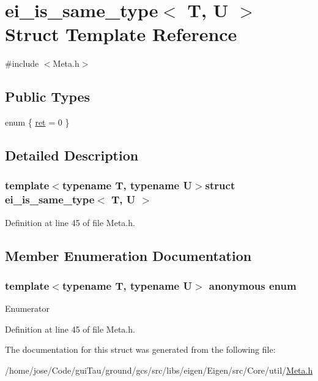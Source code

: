 \hypertarget{structei__is__same__type}{\section{ei\-\_\-is\-\_\-same\-\_\-type$<$ T, U $>$ Struct Template Reference}
\label{structei__is__same__type}
}


{\ttfamily \#include $<$Meta.\-h$>$}

\subsection*{Public Types}
\begin{DoxyCompactItemize}
\item 
enum \{ \hyperlink{structei__is__same__type_a1c77c9dd7ad78d5432afb430c861b08dad71ca8a9f01b3d53f3b65aa1197dd8f2}{ret} = 0
 \}
\end{DoxyCompactItemize}


\subsection{Detailed Description}
\subsubsection*{template$<$typename T, typename U$>$struct ei\-\_\-is\-\_\-same\-\_\-type$<$ T, U $>$}



Definition at line 45 of file Meta.\-h.



\subsection{Member Enumeration Documentation}
\hypertarget{structei__is__same__type_a1c77c9dd7ad78d5432afb430c861b08d}{\subsubsection[{anonymous enum}]{\setlength{\rightskip}{0pt plus 5cm}template$<$typename T, typename U$>$ anonymous enum}}\label{structei__is__same__type_a1c77c9dd7ad78d5432afb430c861b08d}
\begin{Desc}
\item[Enumerator]\par
\begin{description}
\item[{\em 
\hypertarget{structei__is__same__type_a1c77c9dd7ad78d5432afb430c861b08dad71ca8a9f01b3d53f3b65aa1197dd8f2}{ret}\label{structei__is__same__type_a1c77c9dd7ad78d5432afb430c861b08dad71ca8a9f01b3d53f3b65aa1197dd8f2}
}]\end{description}
\end{Desc}


Definition at line 45 of file Meta.\-h.



The documentation for this struct was generated from the following file\-:\begin{DoxyCompactItemize}
\item 
/home/jose/\-Code/gui\-Tau/ground/gcs/src/libs/eigen/\-Eigen/src/\-Core/util/\hyperlink{_meta_8h}{Meta.\-h}\end{DoxyCompactItemize}
